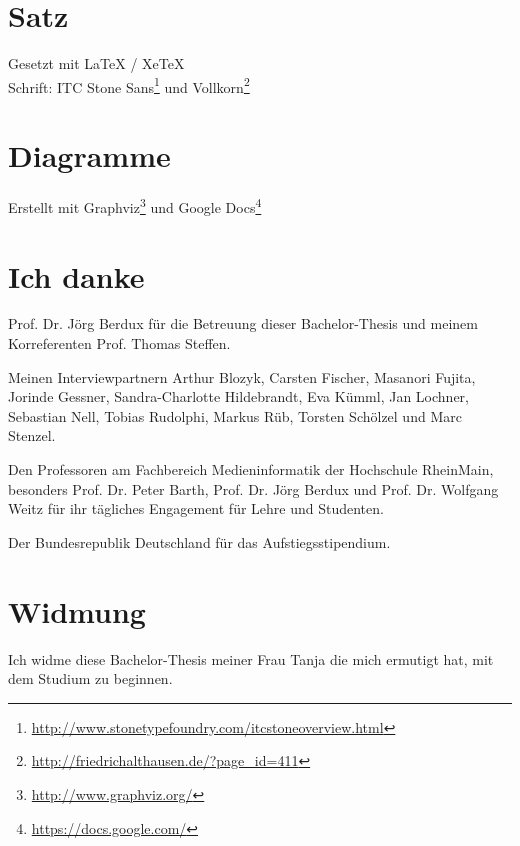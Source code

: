 \section*{Satz}

Gesetzt mit \LaTeX{} / XeTeX \\
Schrift: ITC Stone Sans\footnote{\url{http://www.stonetypefoundry.com/itcstoneoverview.html}} und Vollkorn\footnote{\url{http://friedrichalthausen.de/?page_id=411}}

\section*{Diagramme}

Erstellt mit Graphviz\footnote{\url{http://www.graphviz.org/}} und Google Docs\footnote{\url{https://docs.google.com/}}

\vspace{1cm}

\pagebreak

\section*{Ich danke}

Prof. Dr. Jörg Berdux für die Betreuung dieser Bachelor-Thesis und meinem Korreferenten Prof. Thomas Steffen.

Meinen Interviewpartnern Arthur Blozyk, Carsten Fischer, Masanori Fujita, Jorinde Gessner, Sandra-Charlotte Hildebrandt, Eva Kümml, Jan Lochner, Sebastian Nell, Tobias Rudolphi, Markus Rüb, Torsten Schölzel und Marc Stenzel.

Den Professoren am Fachbereich Medieninformatik der Hochschule RheinMain, besonders Prof. Dr. Peter Barth, Prof. Dr. Jörg Berdux und Prof. Dr. Wolfgang Weitz für ihr tägliches Engagement für Lehre und Studenten.

Der Bundesrepublik Deutschland für das Aufstiegsstipendium.

\section*{Widmung}

Ich widme diese Bachelor-Thesis meiner Frau Tanja die mich ermutigt hat, mit dem Studium zu beginnen.

\pagebreak